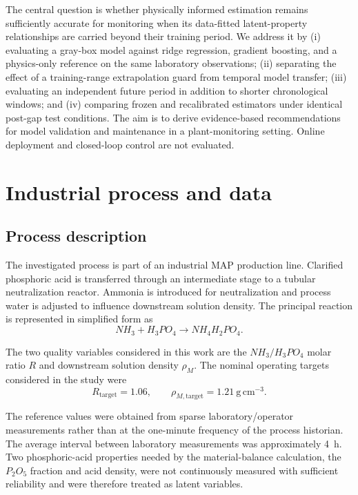\documentclass[preprint,12pt,authoryear]{elsarticle}
\begin{document}
The central question is whether physically informed estimation remains sufficiently accurate for monitoring when its data-fitted latent-property relationships are carried beyond their training period. We address it by (i) evaluating a gray-box model against ridge regression, gradient boosting, and a physics-only reference on the same laboratory observations; (ii) separating the effect of a training-range extrapolation guard from temporal model transfer; (iii) evaluating an independent future period in addition to shorter chronological windows; and (iv) comparing frozen and recalibrated estimators under identical post-gap test conditions. The aim is to derive evidence-based recommendations for model validation and maintenance in a plant-monitoring setting. Online deployment and closed-loop control are not evaluated.

\section{Industrial process and data}

\subsection{Process description}

The investigated process is part of an industrial MAP production line. Clarified phosphoric acid is transferred through an intermediate stage to a tubular neutralization reactor. Ammonia is introduced for neutralization and process water is adjusted to influence downstream solution density. The principal reaction is represented in simplified form as
\begin{equation}
NH_3 + H_3PO_4 \rightarrow NH_4H_2PO_4.
\end{equation}

The two quality variables considered in this work are the $NH_3/H_3PO_4$ molar ratio $R$ and downstream solution density $\rho_M$. The nominal operating targets considered in the study were
\begin{equation}
R_{\mathrm{target}}=1.06,
\qquad
\rho_{M,\mathrm{target}}=1.21\ \mathrm{g\,cm^{-3}}.
\end{equation}

The reference values were obtained from sparse laboratory/operator measurements rather than at the one-minute frequency of the process historian. The average interval between laboratory measurements was approximately 4~h. Two phosphoric-acid properties needed by the material-balance calculation, the $P_2O_5$ fraction and acid density, were not continuously measured with sufficient reliability and were therefore treated as latent variables.
\end{document}
